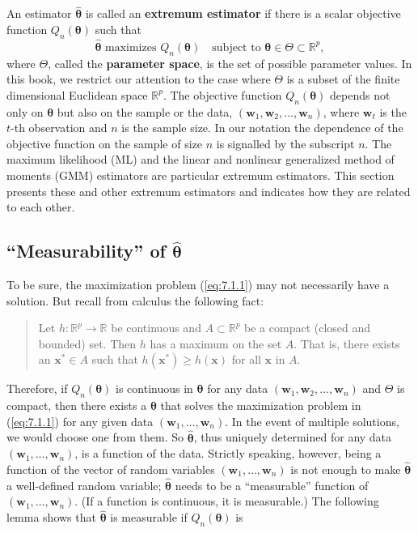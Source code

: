 
An estimator $\hat{\bm{\theta}}$ is called an \textbf{extremum estimator} if there is a scalar objective function $Q_n(\bm{\theta})$ such that
\begin{equation}
\label{eq:7.1.1}
\hat{\bm{\theta}} \text{ maximizes } Q_n(\bm{\theta}) \quad \text{subject to } \bm{\theta} \in \Theta \subset \mathbb{R}^p,
\end{equation}
where $\Theta$, called the \textbf{parameter space}, is the set of possible parameter values. In this book, we restrict our attention to the case where $\Theta$ is a subset of the finite dimensional Euclidean space $\mathbb{R}^p$. The objective function $Q_n(\bm{\theta})$ depends not only on $\bm{\theta}$ but also on the sample or the data, $(\mathbf{w}_1, \mathbf{w}_2, \ldots, \mathbf{w}_n)$, where $\mathbf{w}_t$ is the $t$-th observation and $n$ is the sample size. In our notation the dependence of the objective function on the sample of size $n$ is signalled by the subscript $n$. The maximum likelihood (ML) and the linear and nonlinear generalized method of moments (GMM) estimators are particular extremum estimators. This section presents these and other extremum estimators and indicates how they are related to each other.

\subsection*{``Measurability'' of $\hat{\bm{\theta}}$}

To be sure, the maximization problem (\ref{eq:7.1.1}) may not necessarily have a solution. But recall from calculus the following fact:

\begin{quote}
Let $h : \mathbb{R}^p \to \mathbb{R}$ be continuous and $A \subset \mathbb{R}^p$ be a compact (closed and bounded) set. Then $h$ has a maximum on the set $A$. That is, there exists an $\mathbf{x}^* \in A$ such that $h(\mathbf{x}^*) \geq h(\mathbf{x})$ for all $\mathbf{x}$ in $A$.
\end{quote}

Therefore, if $Q_n(\bm{\theta})$ is continuous in $\bm{\theta}$ for any data $(\mathbf{w}_1, \mathbf{w}_2, \ldots, \mathbf{w}_n)$ and $\Theta$ is compact, then there exists a $\bm{\theta}$ that solves the maximization problem in (\ref{eq:7.1.1}) for any given data $(\mathbf{w}_1, \ldots, \mathbf{w}_n)$. In the event of multiple solutions, we would choose one from them. So $\hat{\bm{\theta}}$, thus uniquely determined for any data $(\mathbf{w}_1, \ldots, \mathbf{w}_n)$, is a function of the data. Strictly speaking, however, being a function of the vector of random variables $(\mathbf{w}_1, \ldots, \mathbf{w}_n)$ is not enough to make $\hat{\bm{\theta}}$ a well-defined random variable; $\hat{\bm{\theta}}$ needs to be a ``measurable'' function of $(\mathbf{w}_1, \ldots, \mathbf{w}_n)$. (If a function is continuous, it is measurable.) The following lemma shows that $\hat{\bm{\theta}}$ is measurable if $Q_n(\bm{\theta})$ is

